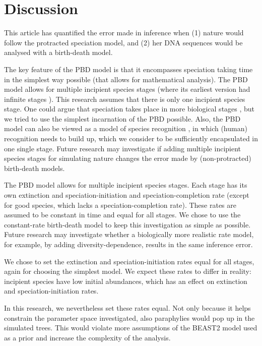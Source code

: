 \section{Discussion}

This article has quantified the error made in inference when (1) nature would follow the
protracted speciation model, and (2) her DNA sequences would be analysed with a birth-death
model.


The key feature of the PBD model is that it encompasses speciation taking time in the
simplest way possible (that allows for mathematical analysis). The PBD model allows for
multiple incipient species stages (where its earliest version had infinite
stages \cite{rosindell2010protracted}). This research assumes that there is only one
incipient species stage. One could argue that speciation takes place in more
biological stages , but we tried to use the simplest incarnation of the PBD possible.
Also, the PBD model can also be viewed as a model of species recognition ,
in which (human) recognition needs to build up, which we consider to be sufficiently
encapsulated in one single stage. Future research may investigate if adding multiple incipient
species stages for simulating nature changes the error made by (non-protracted) birth-death models.


The PBD model allows for multiple incipient species stages. 
Each stage has its own extinction and speciation-initiation and 
speciation-completion rate (except for good species, which lacks 
a speciation-completion rate). These rates are assumed to be constant
in time and equal for all stages. We chose to use the constant-rate
birth-death model to keep this investigation as simple as possible.
Future research may investigate whether a biologically more realistic
rate model, for example, by adding diversity-dependence, results in
the same inference error.

We chose to set the extinction and speciation-initiation rates equal for all stages,
again for choosing the simplest model. We expect these rates to differ in reality:
incipient species have low initial abundances, which has an effect on extinction
and speciation-initiation rates. 

In this research, we nevertheless set these rates equal. 
Not only because it helps constrain the parameter space investigated,
also paraphylies would pop up in the simulated trees. This would violate more assumptions
of the BEAST2 model used as a prior and increase the complexity of the analysis.

